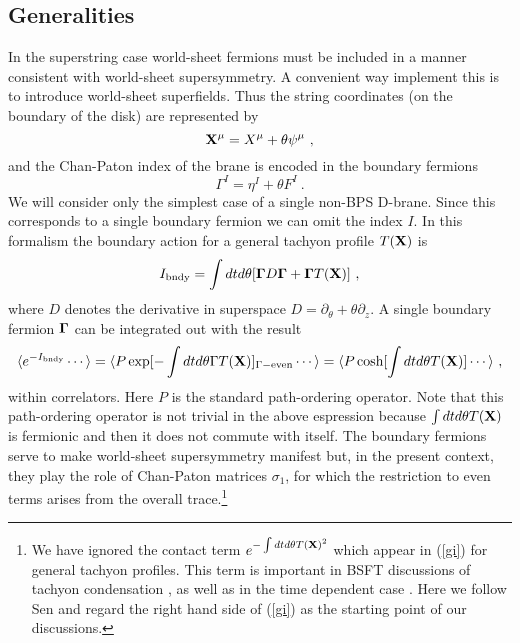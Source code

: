 \documentclass[a4paper,12pt]{article}
\begin{document}
\subsection{Generalities}
In the superstring case world-sheet fermions must be included in a manner consistent 
with world-sheet supersymmetry. A convenient way implement this is to introduce
world-sheet superfields. Thus the string coordinates 
(on the boundary of the disk) are represented by
\begin{equation}
{\bf X^\mu} = X^\mu + \theta \psi^\mu~,
\end{equation}
and the Chan-Paton index of the brane is encoded in the boundary fermions
\begin{equation}
\Gamma^I = \eta^I + \theta F^I~.
\end{equation}
We will consider only the simplest case of a single non-BPS D-brane. Since
this corresponds to a single boundary fermion we can omit the index $I$. 
In this formalism the boundary action for a general tachyon profile $T({\bf X})$ is 
\begin{equation}
I_{\rm bndy} = \int dt d\theta [{\bf\Gamma} D{\bf\Gamma} + {\bf\Gamma} T({\bf X})]~,
\end{equation}
where $D$ denotes the derivative in superspace $D=\partial_\theta + \theta \partial_z$.
A single boundary fermion $\bf{\Gamma}$ can be integrated out with the result
\begin{equation}
\langle e^{-I_{\rm bndy}} \cdots \rangle = 
\langle P \exp[-\int dt d\theta \Gamma T({\bf X})]_{\Gamma-{\rm even}}\cdots \rangle
= \langle P \cosh[\int dt d\theta T({\bf X})]\cdots \rangle ~,
\label{gi}
\end{equation}  
within correlators. 
Here $P$ is the standard path-ordering operator.
Note that 
this path-ordering operator is not trivial in the above espression
because $\int dt d\theta T({\bf X})$ is fermionic 
and then it does not commute with itself.
The boundary fermions serve to make world-sheet supersymmetry 
manifest but, in the present context, they play the role of Chan-Paton matrices $\sigma_1$, 
for which the restriction to even terms arises from the overall trace.\footnote{
We have ignored the contact term $e^{-\int dt d\theta T({\bf X})^2}$ which appear in 
(\ref{gi}) for general tachyon profiles. This term is important in BSFT discussions
of tachyon condensation \cite{Gerasimov:2000zp}, as well as in the time dependent 
case \cite{tmbsft}. Here we follow Sen \cite{Sen2} and regard the right hand side of 
(\ref{gi}) as the starting point of our discussions. }
\end{document}
